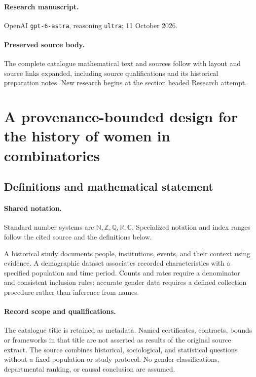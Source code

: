 \documentclass[11pt]{article}
\begin{document}
\paragraph{Research manuscript.} OpenAI \texttt{gpt-6-astra}, reasoning \texttt{ultra}; 11 October 2026.
\paragraph{Preserved source body.} The complete catalogue mathematical text and sources follow with layout and source links expanded, including source qualifications and its historical preparation notes. New research begins at the section headed Research attempt.

\section{A provenance-bounded design for the history of women in combinatorics}\label{statement}

\subsection{Definitions and mathematical statement}

\paragraph{Shared notation.}Standard number systems are $\mathbb N,\mathbb Z,\mathbb Q,\mathbb R,\mathbb C$. Specialized notation and index ranges follow the cited source and the definitions below.


A historical study documents people, institutions, events, and their context using evidence. A demographic dataset associates recorded characteristics with a specified population and time period. Counts and rates require a denominator and consistent inclusion rules; accurate gender data requires a defined collection procedure rather than inference from names.
\paragraph{Record scope and qualifications.}
The catalogue title is retained as metadata. Named certificates, contracts, bounds or frameworks in that title are not asserted as results of the original source extract.
The source combines historical, sociological, and statistical questions without a fixed population or study protocol. No gender classifications, departmental ranking, or causal conclusion are assumed.
\end{document}
